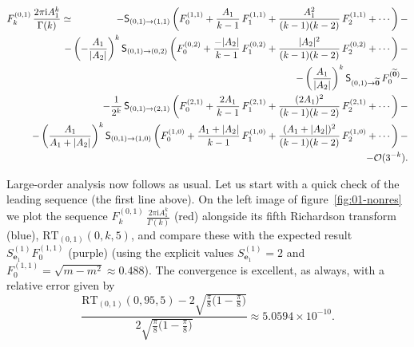 \documentclass[11pt,a4paper]{article}
\newcommand{\be}{\begin{equation}}
\newcommand{\ee}{\end{equation}}
\begin{document}
%
\begin{eqnarray}
\label{eq:01-nonres-BOREL}
F_k^{(0,1)}\, \frac{2\pi\mathrm{i}A_1^k}{\Gamma(k)} &\simeq& - \mathsf{S}_{(0,1) \rightarrow (1,1)} \left( F^{(1,1)}_0 + \frac{A_1}{k-1}\, F^{(1,1)}_1 + \frac{A_1^2}{(k-1)(k-2)}\, F^{(1,1)}_2 + \cdots \right) - \\
&&
\hspace{-50pt}
- \left( -\frac{A_1}{|A_2|} \right)^k \mathsf{S}_{(0,1) \rightarrow (0,2)} \left( F^{(0,2)}_0 + \frac{-|A_2|}{k-1}\, F^{(0,2)}_1 + \frac{|A_2|^2}{(k-1)(k-2)}\, F^{(0,2)}_2 + \cdots \right) - \nonumber \\
&& 
\hspace{-50pt}
- \left( \frac{A_1}{|A_2|} \right)^k \mathsf{S}_{(0,1) \rightarrow \widetilde{\boldsymbol{0}}}\, F_0^{(\widetilde{\boldsymbol 0})} - \nonumber \\
&&
\hspace{-50pt}
- \frac{1}{2^k}\, \mathsf{S}_{(0,1) \rightarrow (2,1)} \left( F^{(2,1)}_0 + \frac{2A_1}{k-1}\, F^{(2,1)}_1 + \frac{(2A_1)^2}{(k-1)(k-2)}\, F^{(2,1)}_2 + \cdots \right) - \nonumber \\
&&
\hspace{-50pt}
- \left( \frac{A_1}{A_1+|A_2|} \right)^k \mathsf{S}_{(0,1) \rightarrow (1,0)} \left( F^{(1,0)}_0 + \frac{A_1+|A_2|}{k-1}\, F^{(1,0)}_1 + \frac{(A_1+|A_2|)^2}{(k-1)(k-2)}\, F^{(1,0)}_2 + \cdots \right) - \nonumber \\
&&
\hspace{-50pt}
- \mathcal{O} (3^{-k}). \nonumber
\end{eqnarray} 

Large-order analysis now follows as usual. Let us start with a quick check of the leading sequence (the first line above). On the left image of figure~\ref{fig:01-nonres} we plot the sequence $F_k^{(0,1)}\, \frac{2\pi\mathrm{i} A_1^k}{\Gamma(k)}$ (red) alongside its fifth Richardson transform (blue), $\mathrm{RT}_{(0,1)}(0,k,5)$, and compare these with the expected result $S^{(1)}_{\boldsymbol{e}_1} F_0^{(1,1)}$ (purple) (using the explicit values $S^{(1)}_{\boldsymbol{e}_1} = 2$ and $F_0^{(1,1)} = \sqrt{m-m^2} \approx 0.488$). The convergence is excellent, as always, with a relative error given by
%
\be
\frac{\mathrm{RT}_{(0,1)}(0,95,5) - 2 \sqrt{\frac{\pi}{8} \big(1-\frac{\pi}{8}\big)}}{2 \sqrt{\frac{\pi}{8} \big(1-\frac{\pi}{8}\big)}} \approx 5.0594 \times 10^{-10}.
\ee
\end{document}
